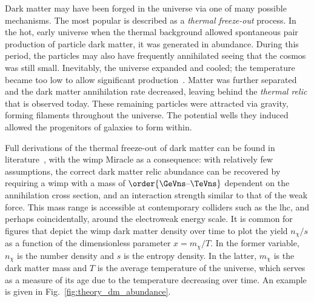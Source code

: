 Dark matter may have been forged in the universe via one of many possible mechanisms. The most popular is described as a \emph{thermal freeze-out} process. In the hot, early universe when the thermal background allowed spontaneous pair production of particle dark matter, it was generated in abundance. During this period, the particles may also have frequently annihilated seeing that the cosmos was still small. Inevitably, the universe expanded and cooled; the temperature became too low to allow significant production~\cite{Baldes:2017gzw}. Matter was further separated and the dark matter annihilation rate decreased, leaving behind the \emph{thermal relic} that is observed today. These remaining particles were attracted via gravity, forming filaments throughout the universe. The potential wells they induced allowed the progenitors of galaxies to form within.

Full derivations of the thermal freeze-out of dark matter can be found in literature~\cite{cosmic_abundances_stable_particles,Bender:2012gc}, with the \acrshort{wimp} Miracle as a consequence: with relatively few assumptions, the correct dark matter relic abundance can be recovered by requiring a \acrfull{wimp} with a mass of $\order{\text{\GeVns--\TeVns}}$ dependent on the annihilation cross section, and an interaction strength similar to that of the weak force. This mass range is accessible at contemporary colliders such as the \acrshort{lhc}, and perhaps coincidentally, around the electroweak energy scale. It is common for figures that depict the \acrshort{wimp} dark matter density over time to plot the yield $n_{\chi}/s$ as a function of the dimensionless parameter $x = m_{\chi}/T$. In the former variable, $n_{\chi}$ is the number density and $s$ is the entropy density. In the latter, $m_{\chi}$ is the dark matter mass and $T$ is the average temperature of the universe, which serves as a measure of its age due to the temperature decreasing over time. An example is given in Fig.~\ref{fig:theory_dm_abundance}.

